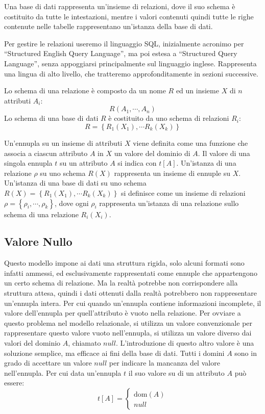 \documentclass{article}
\numberwithin{equation}{subsection}
\begin{document}
Una base di dati rappresenta un'insieme di relazioni, dove il suo schema è costituito da tutte le intestazioni, mentre i valori contenuti quindi tutte le righe 
contenute nelle tabelle rappresentano un'istanza della base di dati. 

Per gestire le relazioni useremo il linguaggio SQL, inizialmente acronimo per ``Structured English Query Language'', ma poi estesa a ``Structured Query Language'', 
senza appoggiarsi principalmente sul linguaggio inglese. Rappresenta una lingua di alto livello, che tratteremo approfonditamente in sezioni successive. 

Lo schema di una relazione è composto da un nome $R$ ed un insieme $X$ di $n$ attributi $A_i$:
\begin{equation}
    R(A_1,\cdots,A_n)
\end{equation} 
Lo schema di una base di dati $R$ è costituito da uno schema di relazioni $R_i$:
\begin{equation}
    R=\left\{R_1(X_1),\cdots R_k(X_k)\right\}
\end{equation}

Un'ennupla su un insieme di attributi $X$ viene definita come una funzione che associa a ciascun attributo $A$ in $X$ un valore del dominio di $A$. 
Il valore di una singola ennupla $t$ su un attributo $A$ si indica con $t[A]$. Un'istanza di una relazione $\rho$ su uno schema $R(X)$ rappresenta un insieme di 
ennuple su $X$. 
Un'istanza di una base di dati su uno schema $R(X)=\left\{R_1(X_1),\cdots R_k(X_k)\right\}$ si definisce come un insieme di relazioni $\rho=\left\{\rho_i,\cdots,\rho_k\right\}$, 
dove ogni $\rho_i$ rappresenta un'istanza di una relazione sullo schema di una relazione $R_i(X_i)$. 

\subsection{Valore Nullo}

Questo modello impone ai dati una struttura rigida, solo alcuni formati sono infatti ammessi, ed esclusivamente rappresentati come ennuple che appartengono un 
certo schema di relazione. Ma la realtà potrebbe non corrispondere alla struttura attesa, quindi i dati ottenuti dalla realtà potrebbero non rappresentare 
un'ennupla intera. 
Per cui quando un'ennupla contiene informazioni incomplete, il valore dell'ennupla per quell'attributo è vuoto nella relazione. Per ovviare a questo problema nel 
modello relazionale, si utilizza un valore convenzionale per rappresentare questo valore vuoto nell'ennupla, si utilizza un valore diverso dai valori del dominio $A$, 
chiamato $null$. 
L'introduzione di questo altro valore è una soluzione semplice, ma efficace ai fini della base di dati. Tutti i domini $A$ sono in grado di accettare un valore $null$ 
per indicare la mancanza del valore nell'ennupla. Per cui data un'ennupla $t$ il suo valore su di un attributo $A$ può essere:
\begin{equation}
    t[A]=\begin{cases}
        \mathrm{dom}(A)\\
        null
    \end{cases}
\end{equation}
\end{document}
